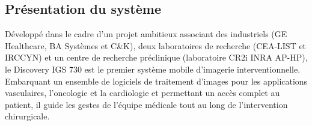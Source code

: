 \vspace{4.5cm}

\def\columnseprulecolor{\color{ocre}}
\setlength{\columnseprule}{0.4pt} 

\setcounter{exo}{0}

\ifprof
\begin{multicols}{2}
\else
\begin{multicols}{2}
\fi


\subsection*{Présentation du système}
Développé dans le cadre d’un projet ambitieux associant des industriels (GE Healthcare, BA Systèmes
et C\&K), deux laboratoires de recherche (CEA-LIST et IRCCYN) et un centre de recherche
préclinique (laboratoire CR2i INRA AP-HP), le Discovery IGS 730 %
est le premier système
mobile d’imagerie interventionnelle. Embarquant un ensemble de logiciels de traitement d’images
pour les applications vasculaires, l’oncologie et la cardiologie %
et permettant un accès complet
au patient, il guide les gestes de l’équipe médicale tout au long de l’intervention chirurgicale.
%



\end{multicols}
\end{multicols}
